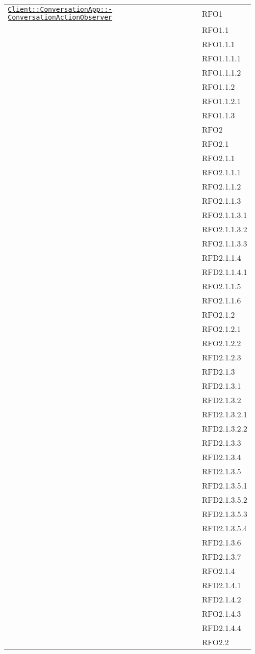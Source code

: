 \begin{longtable}{|>{\centering}m{10cm}|m{3cm}<{\centering}|}
\hyperref[Client::ConversationApp::ConversationActionObserver]{\texttt{Client::ConversationApp::-\linebreak ConversationActionObserver}} & RFO1\\
& RFO1.1\\
& RFO1.1.1\\
& RFO1.1.1.1\\
& RFO1.1.1.2\\
& RFO1.1.2\\
& RFO1.1.2.1\\
& RFO1.1.3\\
& RFO2\\
& RFO2.1\\
& RFO2.1.1\\
& RFO2.1.1.1\\
& RFO2.1.1.2\\
& RFO2.1.1.3\\
& RFO2.1.1.3.1\\
& RFO2.1.1.3.2\\
& RFO2.1.1.3.3\\
& RFD2.1.1.4\\
& RFD2.1.1.4.1\\
& RFO2.1.1.5\\
& RFO2.1.1.6\\
& RFO2.1.2\\
& RFO2.1.2.1\\
& RFO2.1.2.2\\
& RFD2.1.2.3\\
& RFD2.1.3\\
& RFD2.1.3.1\\
& RFD2.1.3.2\\
& RFD2.1.3.2.1\\
& RFD2.1.3.2.2\\
& RFD2.1.3.3\\
& RFD2.1.3.4\\
& RFD2.1.3.5\\
& RFD2.1.3.5.1\\
& RFD2.1.3.5.2\\
& RFD2.1.3.5.3\\
& RFD2.1.3.5.4\\
& RFD2.1.3.6\\
& RFD2.1.3.7\\
& RFO2.1.4\\
& RFD2.1.4.1\\
& RFD2.1.4.2\\
& RFO2.1.4.3\\
& RFD2.1.4.4\\
& RFO2.2\\

\end{longtable}
